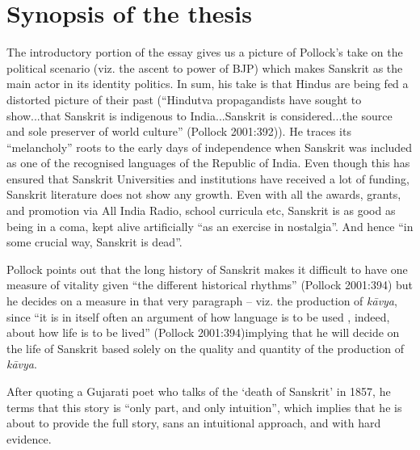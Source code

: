 \section{Synopsis of the thesis}

The introductory portion of the essay gives us a picture of Pollock’s take on the political scenario (viz. the ascent to power of BJP) which makes Sanskrit as the main actor in its identity politics. In sum, his take is that Hindus are being fed a distorted picture of their past (“Hindutva propagandists have sought to show...that Sanskrit is indigenous to India...Sanskrit is considered...the source and sole preserver of world culture” (Pollock 2001:392)). He traces its “melancholy” roots to the early days of independence when Sanskrit was included as one of the recognised languages of the Republic of India. Even though this has ensured that Sanskrit Universities and institutions have received a lot of funding, Sanskrit literature does not show any growth.  Even with all the awards, grants, and promotion via All India Radio, school curricula etc, Sanskrit is as good as being in a coma, kept alive artificially “as an exercise in nostalgia”. And hence “in some crucial way, Sanskrit is dead”.

Pollock points out that the long history of Sanskrit makes it difficult to have one measure of vitality given “the different historical rhythms” (Pollock 2001:394) but he decides on a measure in that very paragraph – viz. the production of {\sl kāvya}, since “it is in itself often an argument of how language is to be used , indeed, about how life is to be lived” (Pollock 2001:394)implying that he will decide on the life of Sanskrit based solely on the quality and quantity of the production of {\sl kāvya}.

After quoting a Gujarati poet who talks of the ‘death of Sanskrit’ in 1857, he terms that this story is “only part, and only intuition”, which implies that he is about to provide the full story, sans an intuitional approach, and with hard evidence.

